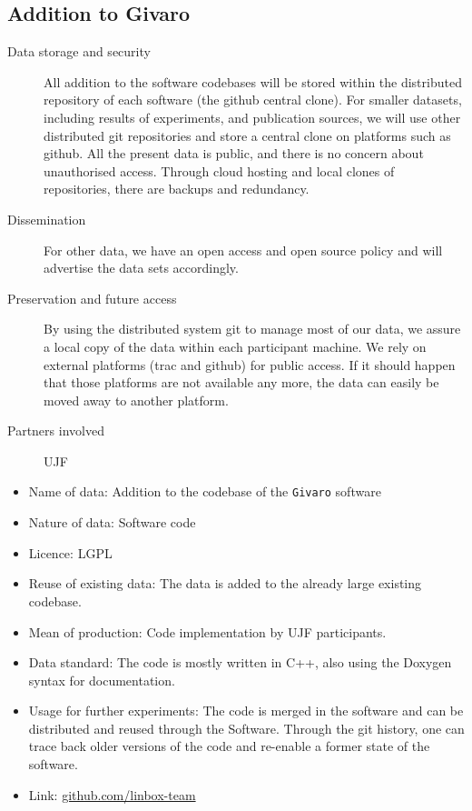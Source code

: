 \documentclass[12pt]{article}
\begin{document}
\begin{enumerate}
\subsection{Addition to Givaro}

\begin{description}
\item[Data storage and security] All addition to the software codebases will be stored within the distributed repository of each software (the github central
  clone). For smaller datasets, including results of experiments, and publication sources, we will use other distributed git repositories and store a central clone on platforms such as github. All the present data is public, and there is no concern about unauthorised access. Through cloud hosting and local clones of
repositories, there are backups and redundancy.
\item[Dissemination] For other data, we have an open access and open source policy and will advertise the data sets accordingly.
\item[Preservation and future access] By using the distributed system git to manage most of our data, we assure a local copy of the data within each participant machine. We rely on external platforms (trac and github) for public access. If it should happen that those platforms are not available any more, the data can easily be moved away to another platform.
\item[Partners involved] UJF
\end{description}


\begin{itemize}
\item{Name of data:} Addition to the codebase of the \texttt{Givaro} software
\item{Nature of data:} Software code
\item{Licence:} LGPL
\item{Reuse of existing data:} The data is added to the already large existing codebase.
\item{Mean of production:} Code implementation by UJF participants.
\item{Data standard:} The code is mostly written in C++, also using the Doxygen syntax for documentation.
\item{Usage for further experiments:} The code is merged in the software and can be distributed and reused through the Software. Through the git history,
one can trace back older versions of the code and re-enable a former state of the software.
\item{Link:} \href{https://github.com/linbox-team}{github.com/linbox-team}
\end{itemize}


\end{enumerate}
\end{document}
